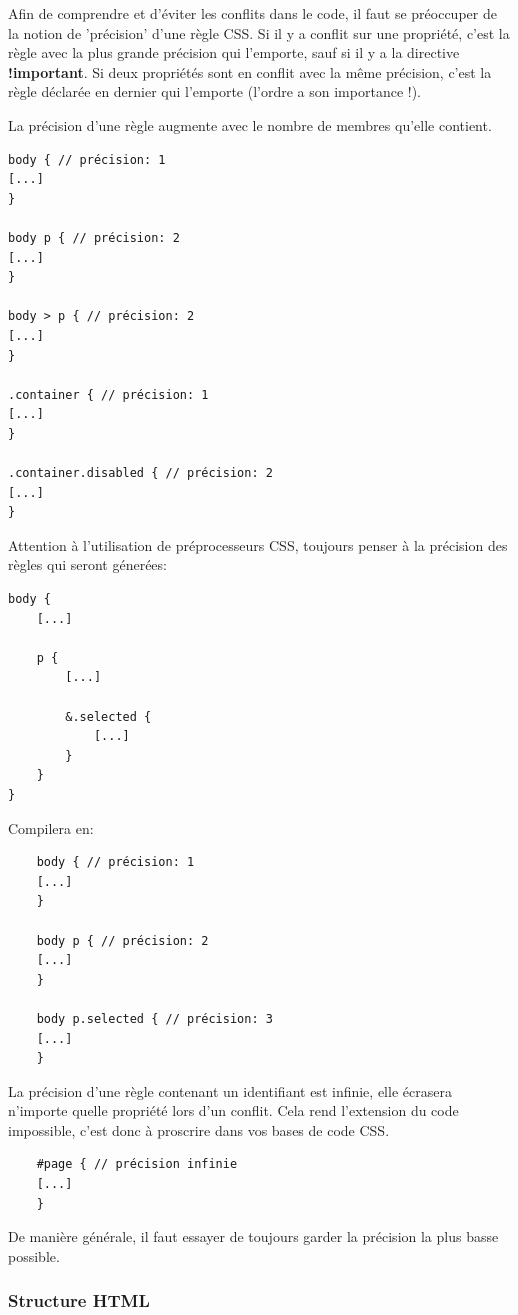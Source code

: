 \documentclass[12pt, a4paper]{report}
\begin{document}
Afin de comprendre et d'éviter les conflits dans le code, il faut se préoccuper de la notion de 'précision' d'une règle CSS.
Si il y a conflit sur une propriété, c'est la règle avec la plus grande précision qui l'emporte, sauf si il y a la directive \textbf{!important}.
Si deux propriétés sont en conflit avec la même précision, c'est la règle déclarée en dernier qui l'emporte (l'ordre a son importance !).

La précision d'une règle augmente avec le nombre de membres qu'elle contient.
\begin{lstlisting}
body { // précision: 1
[...]
}

body p { // précision: 2
[...]
}

body > p { // précision: 2
[...]
}

.container { // précision: 1
[...]
}

.container.disabled { // précision: 2
[...]
}
\end{lstlisting}

Attention à l'utilisation de préprocesseurs CSS, toujours penser à la précision des règles qui seront génerées:
\begin{lstlisting}
body {
    [...]

    p {
        [...]

        &.selected {
            [...]
        }
    }
}
\end{lstlisting}
Compilera en:
\begin{lstlisting}
    body { // précision: 1
    [...]
    }

    body p { // précision: 2
    [...]
    }

    body p.selected { // précision: 3
    [...]
    }
\end{lstlisting}

La précision d'une règle contenant un identifiant est infinie, elle écrasera n'importe quelle propriété lors d'un conflit.
Cela rend l'extension du code impossible, c'est donc à proscrire dans vos bases de code CSS.

\begin{lstlisting}
    #page { // précision infinie
    [...]
    }
\end{lstlisting}

De manière générale, il faut essayer de toujours garder la précision la plus basse possible.


\subsubsection{Structure HTML}
\end{document}
